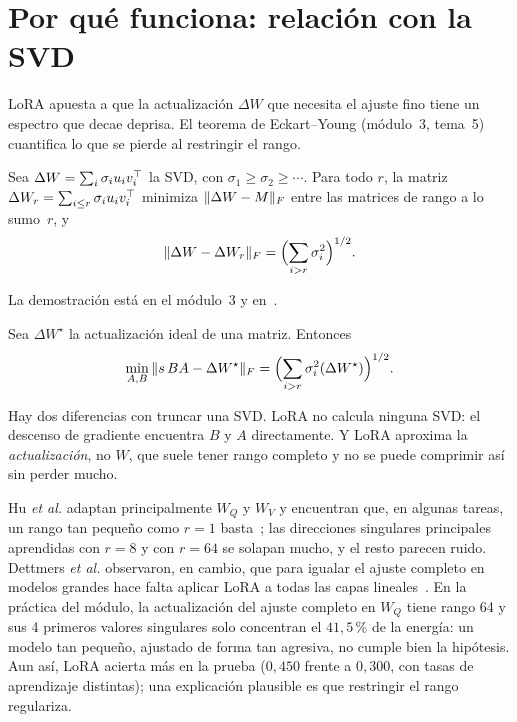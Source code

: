 \section{Por qué funciona: relación con la SVD}

LoRA apuesta a que la actualización $\Delta W$ que necesita el ajuste fino tiene un espectro que decae deprisa. El teorema de Eckart--Young (módulo~3, tema~5) cuantifica lo que se pierde al restringir el rango.

\begin{teorema}\label{teo:ey}
Sea $\Delta W=\sum_i\sigma_iu_iv_i^{\top}$ la SVD, con $\sigma_1\ge\sigma_2\ge\cdots$. Para todo $r$, la matriz $\Delta W_r=\sum_{i\le r}\sigma_iu_iv_i^{\top}$ minimiza $\lVert\Delta W-M\rVert_F$ entre las matrices de rango a lo sumo~$r$, y
\[
\lVert\Delta W-\Delta W_r\rVert_F=\Bigl(\sum_{i>r}\sigma_i^{2}\Bigr)^{1/2}.
\]
\end{teorema}

La demostración está en el módulo~3 y en~\cite{eckart-young}.

\begin{corolario}\label{cor:error-lora}
Sea $\Delta W^{\star}$ la actualización ideal de una matriz. Entonces
\[
\min_{A,B}\,\lVert s\,BA-\Delta W^{\star}\rVert_F=\Bigl(\sum_{i>r}\sigma_i^{2}(\Delta W^{\star})\Bigr)^{1/2}.
\]
\end{corolario}

\addtocounter{definicion}{1}%

Hay dos diferencias con truncar una SVD. LoRA no calcula ninguna SVD: el descenso de gradiente encuentra $B$ y $A$ directamente. Y LoRA aproxima la \emph{actualización}, no $W$, que suele tener rango completo y no se puede comprimir así sin perder mucho.

\begin{observacion}
Hu \emph{et al.} adaptan principalmente $W_Q$ y $W_V$ y encuentran que, en algunas tareas, un rango tan pequeño como $r=1$ basta~\cite[§7.1 y~§7.2]{hu-lora}; las direcciones singulares principales aprendidas con $r=8$ y con $r=64$ se solapan mucho, y el resto parecen ruido. Dettmers \emph{et al.} observaron, en cambio, que para igualar el ajuste completo en modelos grandes hace falta aplicar LoRA a todas las capas lineales~\cite[§4]{dettmers}. En la práctica del módulo, la actualización del ajuste completo en $W_Q$ tiene rango 64 y sus 4 primeros valores singulares solo concentran el $41{,}5\,\%$ de la energía: un modelo tan pequeño, ajustado de forma tan agresiva, no cumple bien la hipótesis. Aun así, LoRA acierta más en la prueba ($0{,}450$ frente a $0{,}300$, con tasas de aprendizaje distintas); una explicación plausible es que restringir el rango regulariza.
\end{observacion}

